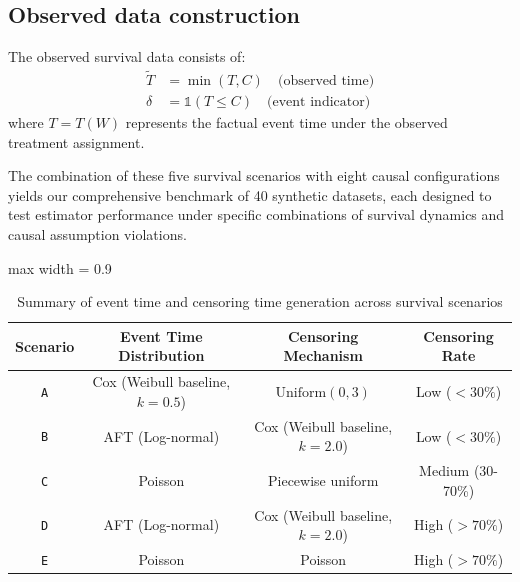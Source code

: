 \documentclass{article} %
\newcommand{\ind}{\mathds{1}}
\begin{document}
\clearpage
\subsection{Observed data construction}
The observed survival data consists of:
\begin{align*}
\tilde{T} &= \min(T, C) \quad \text{(observed time)} \\
\delta &= \ind(T \leq C) \quad \text{(event indicator)}
\end{align*}
where $T = T(W)$ represents the factual event time under the observed treatment assignment.

The combination of these five survival scenarios with eight causal configurations yields our comprehensive benchmark of 40 synthetic datasets, each designed to test estimator performance under specific combinations of survival dynamics and causal assumption violations.



\begin{table}[ht]
\centering
\caption{Summary of event time and censoring time generation across survival scenarios} \vspace{-0.1cm}
\label{tab:survival-scenarios}
\begin{adjustbox}{max width = 0.9\textwidth}
\begin{tabular}{cccc}
\toprule
    \textbf{Scenario} & \textbf{Event Time Distribution} & \textbf{Censoring Mechanism} & \textbf{Censoring Rate} \\
    \midrule
    \texttt{A} & Cox (Weibull baseline, $k=0.5$) & $\text{Uniform}(0, 3)$ & Low ($<30\%$) \\
    \texttt{B} & AFT (Log-normal) & Cox (Weibull baseline, $k=2.0$) & Low ($<30\%$) \\
    \texttt{C} & Poisson & Piecewise uniform & Medium (30-70\%) \\
    \texttt{D} & AFT (Log-normal) & Cox (Weibull baseline, $k=2.0$) & High ($>70\%$) \\
    \texttt{E} & Poisson & Poisson & High ($>70\%$) \\
\bottomrule
\end{tabular}
\end{adjustbox}
\end{table}
\end{document}
